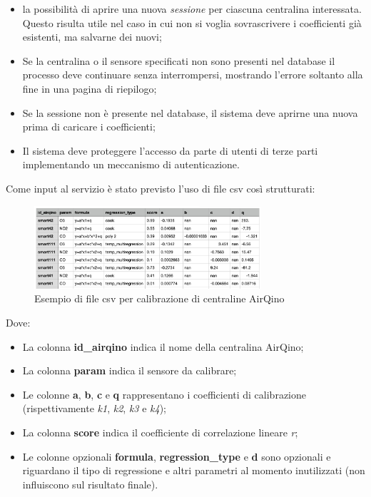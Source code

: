 \begin{itemize}
  \item la possibilità di aprire una nuova \textit{sessione} per ciascuna centralina interessata. Questo risulta utile nel caso in cui non si voglia sovrascrivere i coefficienti già esistenti, ma salvarne dei nuovi;
  \item Se la centralina o il sensore specificati non sono presenti nel database il processo deve continuare senza interrompersi, mostrando l'errore soltanto alla fine in una pagina di riepilogo;
  \item Se la sessione non è presente nel database, il sistema deve aprirne una nuova prima di caricare i coefficienti;
  \item Il sistema deve proteggere l'accesso da parte di utenti di terze parti implementando un meccanismo di autenticazione.
\end{itemize}

Come input al servizio è stato previsto l'uso di file csv così strutturati:

\begin{figure}[H]
\centering
\includegraphics[width=0.75\textwidth,height=\textheight,keepaspectratio]{img/csv_calib}
\caption{Esempio di file csv per calibrazione di centraline AirQino}
\label{fig:csv-calib}
\end{figure}

Dove: 

\begin{itemize}
  \item La colonna \textbf{id\_airqino} indica il nome della centralina AirQino;
  \item La colonna \textbf{param} indica il sensore da calibrare;
  \item Le colonne \textbf{a}, \textbf{b}, \textbf{c} e \textbf{q} rappresentano i coefficienti di calibrazione (rispettivamente \textit{k1}, \textit{k2}, \textit{k3} e \textit{k4});
  \item La colonna \textbf{score} indica il coefficiente di correlazione lineare \textit{r};
  \item Le colonne opzionali \textbf{formula}, \textbf{regression\_type} e \textbf{d} sono opzionali e riguardano il tipo di regressione e altri parametri al momento inutilizzati (non influiscono sul risultato finale).
\end{itemize}

